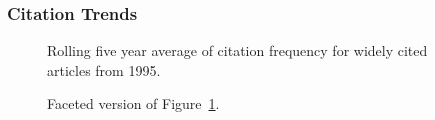 \documentclass[
  10pt,
  letterpaper,
  DIV=11,
  numbers=noendperiod,
  twoside]{scrartcl}
\begin{document}
\subsubsection*{Citation Trends}\label{sec-trends-1995}

\begin{figure}


\caption{\label{fig-citation-spaghetti-1995}Rolling five year average of
citation frequency for widely cited articles from 1995.}

\end{figure}%

\begin{figure}


\caption{\label{fig-citation-facet-1995}Faceted version of
Figure~\ref{fig-citation-spaghetti-1995}.}

\end{figure}%
\end{document}
